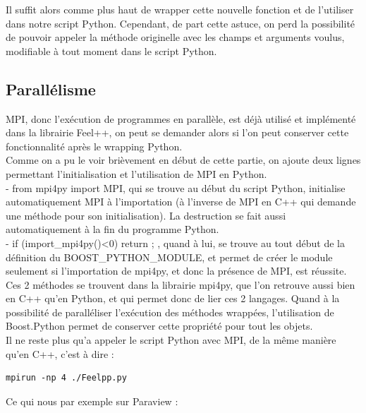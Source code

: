 \documentclass[french,12pt]{article}
\begin{document}
Il suffit alors comme plus haut de wrapper cette nouvelle fonction et de l'utiliser dans notre script Python. Cependant, de part cette astuce, on perd la possibilité de pouvoir appeler la méthode originelle avec les champs et arguments voulus, modifiable à tout moment dans le script Python.

\subsection{Parallélisme}

MPI, donc l'exécution de programmes en parallèle, est déjà utilisé et implémenté dans la librairie Feel++, on peut se demander alors si l'on peut conserver cette fonctionnalité après le wrapping Python.\\

Comme on a pu le voir brièvement en début de cette partie, on ajoute deux lignes permettant l'initialisation et l'utilisation de MPI en Python.\\

- from mpi4py import MPI, qui se trouve au début du script Python, initialise automatiquement MPI à l'importation (à l'inverse de MPI en C++ qui demande une méthode pour son initialisation). La destruction se  fait aussi automatiquement à la fin du programme Python.\\

- if (import\_mpi4py()<0) return ; , quand à lui, se trouve au tout début de la définition du BOOST\_PYTHON\_MODULE, et permet de créer le module seulement si l'importation de mpi4py, et donc la présence de MPI, est réussite.\\

Ces 2 méthodes se trouvent dans la librairie mpi4py, que l'on retrouve aussi bien en C++ qu'en Python, et qui permet donc de lier ces 2 langages. Quand à la possibilité de paralléliser l'exécution des méthodes wrappées, l'utilisation de Boost.Python permet de conserver cette propriété pour tout les objets.\\

Il ne reste plus qu'a appeler le script Python avec MPI, de la même manière qu'en C++, c'est à dire : \\
\begin{lstlisting}
mpirun -np 4 ./Feelpp.py
\end{lstlisting}

Ce qui nous par exemple sur Paraview : \\
\end{document}
